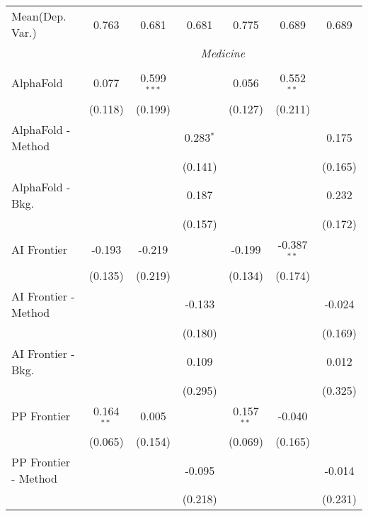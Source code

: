 \begin{tabular}{lcccccc}
Mean(Dep. Var.) & 0.763 & 0.681 & 0.681 & 0.775 & 0.689 & 0.689 \\
 & \multicolumn{6}{c}{\textit{Medicine}} \\ \\
   AlphaFold            & 0.077        & 0.599$^{***}$ &             & 0.056        & 0.552$^{**}$  &   \\   
                        & (0.118)      & (0.199)       &             & (0.127)      & (0.211)       &   \\   
   AlphaFold - Method   &              &               & 0.283$^{*}$ &              &               & 0.175\\   
                        &              &               & (0.141)     &              &               & (0.165)\\   
   AlphaFold - Bkg.     &              &               & 0.187       &              &               & 0.232\\   
                        &              &               & (0.157)     &              &               & (0.172)\\   
   AI Frontier          & -0.193       & -0.219        &             & -0.199       & -0.387$^{**}$ &   \\   
                        & (0.135)      & (0.219)       &             & (0.134)      & (0.174)       &   \\   
   AI Frontier - Method &              &               & -0.133      &              &               & -0.024\\   
                        &              &               & (0.180)     &              &               & (0.169)\\   
   AI Frontier - Bkg.   &              &               & 0.109       &              &               & 0.012\\   
                        &              &               & (0.295)     &              &               & (0.325)\\   
   PP Frontier          & 0.164$^{**}$ & 0.005         &             & 0.157$^{**}$ & -0.040        &   \\   
                        & (0.065)      & (0.154)       &             & (0.069)      & (0.165)       &   \\   
   PP Frontier - Method &              &               & -0.095      &              &               & -0.014\\   
                        &              &               & (0.218)     &              &               & (0.231)\\   

\end{tabular}
